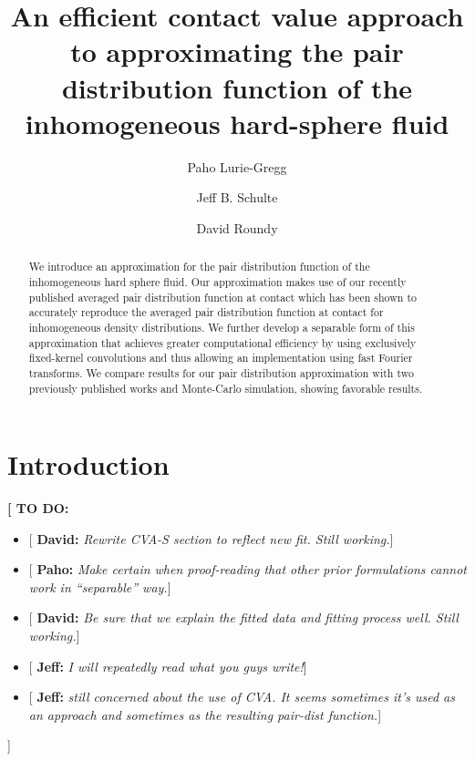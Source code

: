 \documentclass[letterpaper,twocolumn,amsmath,amssymb,pre,aps,10pt]{revtex4-1}
\newcommand{\red}[1]{{\bf \color{red} #1}}
\newcommand{\green}[1]{{\bf \color{green} #1}}
\newcommand{\blue}[1]{{\bf \color{blue} #1}}
\newcommand{\cyan}[1]{{\bf \color{cyan} #1}}
\newcommand{\fixme}[1]{\red{[#1]}}
\newcommand{\davidsays}[1]{{\color{red} [\green{David:} \emph{#1}]}}
\newcommand{\jeffsays}[1]{{\color{red} [\cyan{Jeff:} \emph{#1}]}}
\newcommand{\pahosays}[1]{{\color{red} [\blue{Paho:} \emph{#1}]}}
\begin{document}
\title{An efficient contact value approach to approximating the pair distribution
  function of the inhomogeneous hard-sphere fluid}

\author{Paho Lurie-Gregg}
\author{Jeff B. Schulte}
\author{David Roundy}

\begin{abstract}
We introduce an approximation for the pair distribution function of
the inhomogeneous hard sphere fluid. Our approximation makes use of
our recently published averaged pair distribution function at contact
which has been shown to accurately reproduce the averaged pair
distribution function at contact for inhomogeneous density
distributions. We further develop a separable form of this
approximation that achieves greater computational efficiency by using
exclusively fixed-kernel convolutions and thus allowing an
implementation using fast Fourier transforms. We compare results for
our pair distribution approximation with two previously published
works and Monte-Carlo simulation, showing favorable results.
\end{abstract}

\maketitle

\section{Introduction}

\fixme{
  TO DO:
  \begin{itemize}
  \item \davidsays{Rewrite CVA-S section to reflect new fit.  Still working.}
  \item \pahosays{Make certain when proof-reading that other prior
    formulations cannot work in ``separable'' way.}
  \item \davidsays{Be sure that we explain the fitted data and fitting
    process well.  Still working.}
  \item \jeffsays{I will repeatedly read what you guys write!}
  \item \jeffsays{still concerned about the use of CVA.  It seems
    sometimes it's used as an approach and sometimes as the resulting
    pair-dist function.}
  \end{itemize}
}
\end{document}
